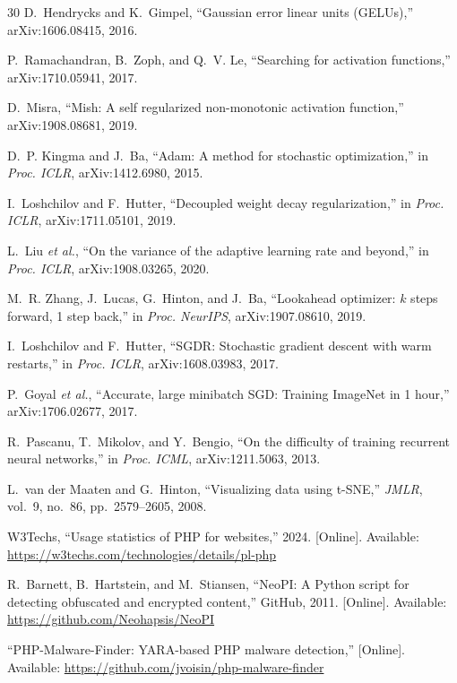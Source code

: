\documentclass[10pt,conference,letterpaper]{IEEEtran}
\begin{document}
\begin{thebibliography}{30}
D.~Hendrycks and K.~Gimpel, ``Gaussian error linear units (GELUs),''
arXiv:1606.08415, 2016.

P.~Ramachandran, B.~Zoph, and Q.~V. Le, ``Searching for activation
functions,'' arXiv:1710.05941, 2017.

D.~Misra, ``Mish: A self regularized non-monotonic activation function,''
arXiv:1908.08681, 2019.

D.~P. Kingma and J.~Ba, ``Adam: A method for stochastic optimization,'' in
\emph{Proc. ICLR}, arXiv:1412.6980, 2015.

I.~Loshchilov and F.~Hutter, ``Decoupled weight decay regularization,'' in
\emph{Proc. ICLR}, arXiv:1711.05101, 2019.

L.~Liu \emph{et al.}, ``On the variance of the adaptive learning rate and
beyond,'' in \emph{Proc. ICLR}, arXiv:1908.03265, 2020.

M.~R. Zhang, J.~Lucas, G.~Hinton, and J.~Ba, ``Lookahead optimizer: $k$ steps
forward, 1 step back,'' in \emph{Proc. NeurIPS}, arXiv:1907.08610, 2019.

I.~Loshchilov and F.~Hutter, ``SGDR: Stochastic gradient descent with warm
restarts,'' in \emph{Proc. ICLR}, arXiv:1608.03983, 2017.

P.~Goyal \emph{et al.}, ``Accurate, large minibatch SGD: Training ImageNet in
1 hour,'' arXiv:1706.02677, 2017.

R.~Pascanu, T.~Mikolov, and Y.~Bengio, ``On the difficulty of training
recurrent neural networks,'' in \emph{Proc. ICML}, arXiv:1211.5063, 2013.

L.~van der Maaten and G.~Hinton, ``Visualizing data using t-SNE,'' \emph{JMLR},
vol.~9, no.~86, pp.~2579--2605, 2008.

W3Techs, ``Usage statistics of PHP for websites,'' 2024.
[Online]. Available: \url{https://w3techs.com/technologies/details/pl-php}

R.~Barnett, B.~Hartstein, and M.~Stiansen, ``NeoPI: A Python script for
detecting obfuscated and encrypted content,'' GitHub, 2011.
[Online]. Available: \url{https://github.com/Neohapsis/NeoPI}

``PHP-Malware-Finder: YARA-based PHP malware detection,''
[Online]. Available: \url{https://github.com/jvoisin/php-malware-finder}


\end{thebibliography}
\end{document}
